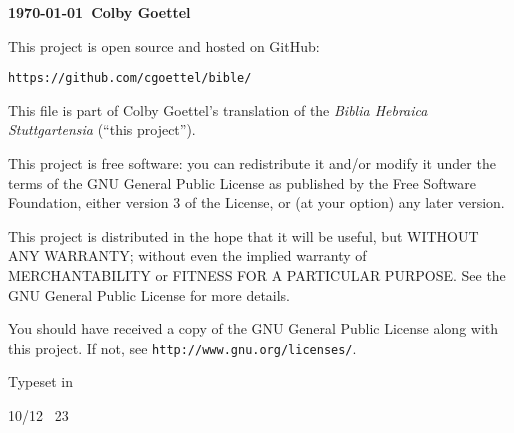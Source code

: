 {\small
\vfil

{\noindent\textbf{\textcopyleft\thinspace\justtheyear\today\ Colby Goettel}}

\vfil

{\noindent This project is open source and hosted on GitHub:}
\begin{center}
    \texttt{https://github.com/cgoettel/bible/}
\end{center}

\vfil

This file is part of Colby Goettel's translation of the \emph{Biblia Hebraica Stuttgartensia} (``this project'').

This project is free software: you can redistribute it and/or modify it under the terms of the GNU General Public License as published by the Free Software Foundation, either version 3 of the License, or (at your option) any later version.

This project is distributed in the hope that it will be useful, but WITHOUT ANY WARRANTY; without even the implied warranty of MERCHANTABILITY or FITNESS FOR A PARTICULAR PURPOSE.  See the GNU General Public License for more details.

You should have received a copy of the GNU General Public License along with this project. If not, see \texttt{http://www.gnu.org/licenses/}.

\vfil

Typeset in \XeTeX

10/12 \texttimes\ 23
}
